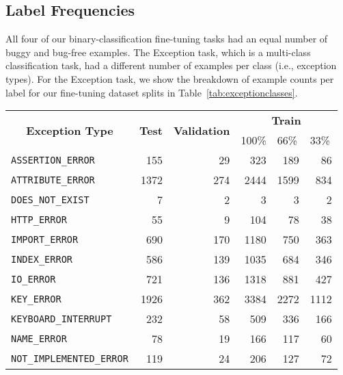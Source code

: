 \documentclass{article}
\begin{document}
\subsection{{Label Frequencies}}
All four of our binary-classification fine-tuning tasks had an equal number of buggy and bug-free examples.
The Exception task, which is a multi-class classification task, had a different number of examples per class (i.e., exception types). For the Exception task, we show the breakdown of example counts per label for our fine-tuning dataset splits in Table~\ref{tab:exceptionclasses}.

\begin{table*}
\centering
\begin{tabular}{|l|r|r|rrr|}
\hline
\multicolumn{1}{|c|}{\multirow{2}{*}{\textbf{Exception Type}}} & \multicolumn{1}{c|}{\multirow{2}{*}{\textbf{Test}}} & \multicolumn{1}{c|}{\multirow{2}{*}{\textbf{Validation}}} & \multicolumn{3}{c|}{\textbf{Train}}                                              \\
\multicolumn{1}{|c|}{}                                         & \multicolumn{1}{c|}{}                               & \multicolumn{1}{c|}{}                                     & \multicolumn{1}{l}{100\%} & \multicolumn{1}{l}{66\%} & \multicolumn{1}{l|}{33\%} \\ \hline
\verb+ASSERTION_ERROR+&	\num{155}&	\num{29}&	\num{323}&	\num{189}&	\num{86}\\
\verb+ATTRIBUTE_ERROR+&	\num{1372}&	\num{274}&	\num{2444}&	\num{1599}&	\num{834}\\
\verb+DOES_NOT_EXIST+&	\num{7}&	\num{2}&	\num{3}&	\num{3}&	\num{2}\\
\verb+HTTP_ERROR+&	\num{55}&	\num{9}&	\num{104}&	\num{78}&	\num{38}\\
\verb+IMPORT_ERROR+&	\num{690}&	\num{170}&	\num{1180}&	\num{750}&	\num{363}\\
\verb+INDEX_ERROR+&	\num{586}&	\num{139}&	\num{1035}&	\num{684}&	\num{346}\\
\verb+IO_ERROR+&	\num{721}&	\num{136}&	\num{1318}&	\num{881}&	\num{427}\\
\verb+KEY_ERROR+&	\num{1926}&	\num{362}&	\num{3384}&	\num{2272}&	\num{1112}\\
\verb+KEYBOARD_INTERRUPT+&	\num{232}&	\num{58}&	\num{509}&	\num{336}&	\num{166}\\
\verb+NAME_ERROR+&	\num{78}&	\num{19}&	\num{166}&	\num{117}&	\num{60}\\
\verb+NOT_IMPLEMENTED_ERROR+&	\num{119}&	\num{24}&	\num{206}&	\num{127}&	\num{72}\\

\end{tabular}
\end{table*}
\end{document}
